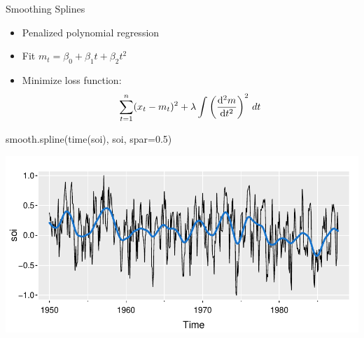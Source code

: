 \documentclass[ignorenonframetext,xcolor=x11names]{beamer}
\begin{document}
\begin{frame}[fragile]{Smoothing Splines}
\begin{itemize}
  \item Penalized polynomial regression
  \item Fit $m_t = \beta_0 + \beta_1 t + \beta_2 t^2$
  \item Minimize loss function:
\begin{align*}
\sum_{t=1}^n (x_t - m_t)^2 + \lambda \int \left( \dv[2]{m}{t} \right)^2 \, dt
\end{align*}
\end{itemize}
\begin{Rcode}
smooth.spline(time(soi), soi, spar=0.5)
\end{Rcode}
\vspace{-1.5\baselineskip}
\begin{center}
\includegraphics[width=.75\textwidth]{figure17.pdf}
\end{center}
\end{frame}
\end{document}
